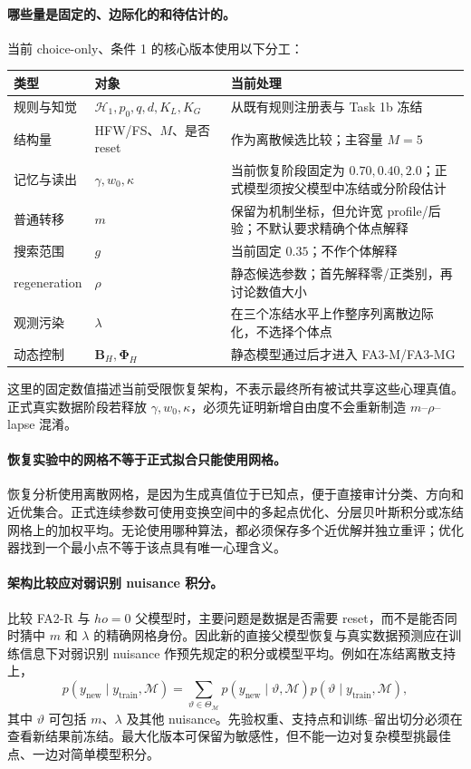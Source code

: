 \paragraph{哪些量是固定的、边际化的和待估计的。}
当前 choice-only、条件 1 的核心版本使用以下分工：
\begin{center}
\small
\begin{tabular}{p{}|p{}|p{}}
\hline
类型 & 对象 & 当前处理\\
\hline
规则与知觉 & $\mathcal H_1,p_0,q,d,K_L,K_G$ & 从既有规则注册表与 Task 1b 冻结\\
结构量 & HFW/FS、$M$、是否 reset & 作为离散候选比较；主容量 $M=5$\\
记忆与读出 & $\gamma,w_0,\kappa$ & 当前恢复阶段固定为 $0.70,0.40,2.0$；正式模型须按父模型中冻结或分阶段估计\\
普通转移 & $m$ & 保留为机制坐标，但允许宽 profile/后验；不默认要求精确个体点解释\\
搜索范围 & $g$ & 当前固定 $0.35$；不作个体解释\\
regeneration & $\rho$ & 静态候选参数；首先解释零/正类别，再讨论数值大小\\
观测污染 & $\lambda$ & 在三个冻结水平上作整序列离散边际化，不选择个体点\\
动态控制 & $\mathbf B_H,\boldsymbol\Phi_H$ & 静态模型通过后才进入 FA3-M/FA3-MG\\
\hline
\end{tabular}
\normalsize
\end{center}
这里的固定数值描述当前受限恢复架构，不表示最终所有被试共享这些心理真值。正式真实数据阶段若释放 $\gamma,w_0,\kappa$，必须先证明新增自由度不会重新制造 $m$--$\rho$--lapse 混淆。

\paragraph{恢复实验中的网格不等于正式拟合只能使用网格。}
恢复分析使用离散网格，是因为生成真值位于已知点，便于直接审计分类、方向和近优集合。正式连续参数可使用变换空间中的多起点优化、分层贝叶斯积分或冻结网格上的加权平均。无论使用哪种算法，都必须保存多个近优解并独立重评；优化器找到一个最小点不等于该点具有唯一心理含义。

\paragraph{架构比较应对弱识别 nuisance 积分。}
比较 FA2-R 与 $
ho=0$ 父模型时，主要问题是数据是否需要 reset，而不是能否同时猜中 $m$ 和 $\lambda$ 的精确网格身份。因此新的直接父模型恢复与真实数据预测应在训练信息下对弱识别 nuisance 作预先规定的积分或模型平均。例如在冻结离散支持上，
\begin{equation}
    p(y_{\mathrm{new}}\mid y_{\mathrm{train}},\mathcal M)
    =\sum_{\vartheta\in\Theta_{\mathcal M}}
      p(y_{\mathrm{new}}\mid\vartheta,\mathcal M)
      p(\vartheta\mid y_{\mathrm{train}},\mathcal M),
    \label{eq:model0805-parameter-average}
\end{equation}
其中 $\vartheta$ 可包括 $m$、$\lambda$ 及其他 nuisance。先验权重、支持点和训练--留出切分必须在查看新结果前冻结。最大化版本可保留为敏感性，但不能一边对复杂模型挑最佳点、一边对简单模型积分。

